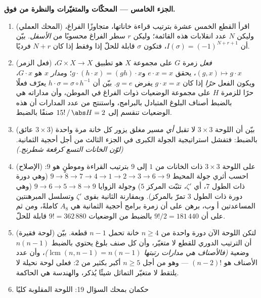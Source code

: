 \begin{problem}
\medskip
\noindent\textbf{الجزء الخامس --- المحكّات والمتغيّرات
والنظرة من فوق.}
\begin{enumerate}[resume]
  \item (المحك العملي) اقرأ القطع الخمس عشرة بترتيب قراءة
        خاناتها، متجاوزًا الفراغ، وليكن $N$ عدد انقلابات هذه
        القائمة؛ وليكن $r$ سطر الفراغ محسوبًا من \emph{الأسفل}. بيّن
        أن $I(\sigma) = (-1)^{N + r + 1}$، فتكون $\sigma$
        قابلة للحلّ إذا وفقط إذا كان $N + r$ فرديًا.
  \item (فعل الزمر) \emph{فعل} زمرة $G$ على مجموعة
        $X$ هو تطبيق $G \times X \to X$، $(g, x) \mapsto g \cdot
        x$، يحقق $e \cdot x = x$ و$g \cdot (h \cdot x) =
        (gh) \cdot x$؛ و\emph{مدار} $x$ هو $G \cdot x$، ويكون
        الفعل \emph{حرًا} إذا كان $g \cdot x = x$ يفرض $g =
        e$. بيّن أن $h \cdot \sigma = \sigma \circ h^{-1}$
        يعرّف فعلًا حرًا للزمرة $H$ على مجموعة الوضعيات ذوات
        الفراغ في الموطن، وأن مداراته هي بالضبط أصناف
        البلوغ المتبادل بالبرامج، واستنتج من عدد المدارات
        أن هذه الوضعيات تنقسم إلى $15!\,/\,\abs H = 2$ صنفًا بالضبط.
  \item (عائق $3 \times 3$) بيّن أن اللوحة $3 \times 3$
        لا تقبل \emph{أي} مسير مغلق يزور كل خانة
        مرة واحدة بالضبط: فتفشل استراتيجية الجولة الكبرى
        في الجزء الثالث من أجل أحجية الثمانية. \emph{(لوّن الخانات
        التسع كرقعة شطرنج.)}
  \item (الإصلاح) على اللوحة $3 \times 3$ ذات الخانات من $1$ إلى
        $9$ بترتيب القراءة وموطنٍ هو $9$: احسب أثري
        جولة المحيط $9 \to 8 \to 7 \to 4 \to 1 \to 2 \to 3
        \to 6 \to 9$ (وهي دورة ذات الطول $7$، أي $\zeta'$، تثبّت المركز $5$)
        وجولة الزوايا $9 \to 6 \to 5 \to 8 \to 9$ (وهي
        دورة ذات الطول $3$ تمرّ بالمركز). وبمقارنة الثانية بقوى
        $\zeta'$ وتسلسل المبرهنتين المساعدتين أ وب، برهن
        على أن زمرة برامج أحجية الثمانية هي $A_8$ كاملةً،
        ومن ثم على أن $9!/2 = 181\,440$ بالضبط من الوضعيات $9! =
        362\,880$ قابلة للحلّ.
  \item (لوحة فقيرة) لتكن اللوحة الآن دورة واحدة من $n
        \geq 4$ خانة
        تحمل $n - 1$ قطعة. بيّن أن الترتيب الدوري
        للقطع لا متغيّر، وأن كل صنف بلوغ يحتوي بالضبط $n(n - 1)$
        وضعية \emph{(فالأصناف هي مدارات  رتبتها
        $\operatorname{lcm}(n, n-1) = n(n-1)$)}، وأن عدد الأصناف
        هو $(n - 2)!$ --- وهو من أجل $n \geq 5$ أكبر بكثير من
        $2$: فعلى لوحة نحيلة لا يلتقط لا متغيّر التماثل شيئًا
        يُذكر، والهندسة هي الحاكمة.
  \item حكمان بمحك السؤال 19: اللوحة المقلوبة كليًا

\end{enumerate}
\end{problem}
